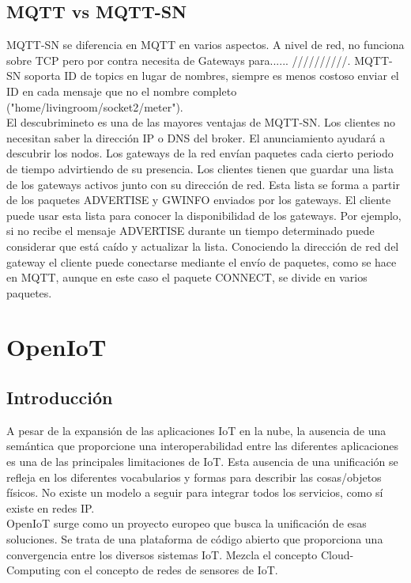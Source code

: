 \documentclass[12pt, twoside]{book}
\begin{document}
\section{MQTT vs MQTT-SN}
MQTT-SN se diferencia en MQTT en varios aspectos. A nivel de red, no funciona sobre TCP pero por contra necesita de Gateways para...... //////////.
MQTT-SN soporta ID de topics en lugar de nombres, siempre es menos costoso enviar el ID en cada mensaje que no el nombre completo ("home/livingroom/socket2/meter"). \\
El descubrimineto es una de las mayores ventajas de MQTT-SN. Los clientes no necesitan saber la dirección IP o DNS del broker. El anunciamiento ayudará a descubrir los nodos. Los gateways de la red envían paquetes cada cierto periodo de tiempo advirtiendo de su presencia. Los clientes tienen que guardar una lista de los gateways activos junto con su dirección de red. Esta lista se forma a partir de los paquetes ADVERTISE y GWINFO enviados por los gateways. El cliente puede usar esta lista para conocer la disponibilidad de los gateways. Por ejemplo, si no recibe el mensaje ADVERTISE durante un tiempo determinado puede considerar que está caído y actualizar la lista. Conociendo la dirección de red del gateway el cliente puede conectarse mediante el envío de paquetes, como se hace en MQTT, aunque en este caso el paquete CONNECT, se divide en varios paquetes.
\chapter{OpenIoT}
\section{Introducción}
A pesar de la expansión de las aplicaciones IoT en la nube, la ausencia de una semántica que proporcione una interoperabilidad entre las diferentes aplicaciones es una de las principales limitaciones de IoT. Esta ausencia de una unificación se refleja en los diferentes vocabularios y formas para describir las cosas/objetos físicos. No existe un modelo a seguir para integrar todos los servicios, como sí existe en redes IP. \\

OpenIoT surge como un proyecto europeo que busca la unificación de esas soluciones. Se trata de una plataforma de código abierto que proporciona una convergencia entre los diversos sistemas IoT. Mezcla el concepto Cloud-Computing con el concepto de redes de sensores de IoT.\\ 
\end{document}
